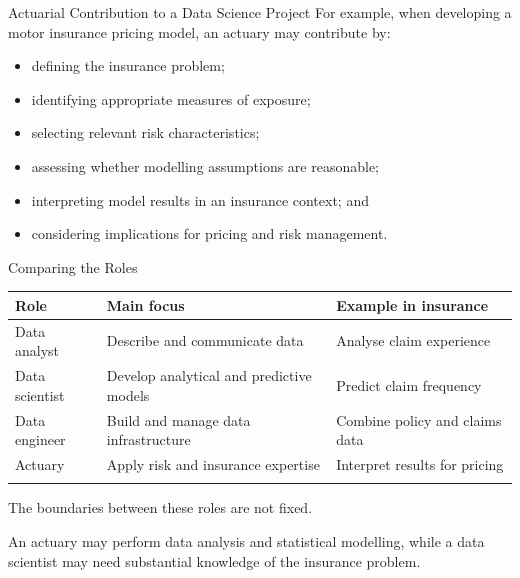 \documentclass[
  ignorenonframetext,
  aspectratio=169,
]{beamer}
\newcounter{none} %
\providecommand{\tightlist}{%
  \setlength{\itemsep}{0pt}\setlength{\parskip}{0pt}}
\begin{document}
\begin{frame}{Actuarial Contribution to a Data Science Project}
\protect{}\label{actuarial-contribution-to-a-data-science-project}
For example, when developing a motor insurance pricing model, an actuary
may contribute by:

\begin{itemize}
\tightlist
\item
  defining the insurance problem;
\item
  identifying appropriate measures of exposure;
\item
  selecting relevant risk characteristics;
\item
  assessing whether modelling assumptions are reasonable;
\item
  interpreting model results in an insurance context; and
\item
  considering implications for pricing and risk management.
\end{itemize}
\end{frame}

\begin{frame}{Comparing the Roles}
\protect{}\label{comparing-the-roles}
{\def\LTcaptype{none} %
\begin{longtable}[]{@{}
  >{\raggedright\arraybackslash}p{}
  >{\raggedright\arraybackslash}p{}
  >{\raggedright\arraybackslash}p{}@{}}
\toprule\noalign{}
\begin{minipage}[b]{\linewidth}\raggedright
Role
\end{minipage} & \begin{minipage}[b]{\linewidth}\raggedright
Main focus
\end{minipage} & \begin{minipage}[b]{\linewidth}\raggedright
Example in insurance
\end{minipage} \\
\midrule\noalign{}
\endhead
Data analyst & Describe and communicate data & Analyse claim
experience \\
Data scientist & Develop analytical and predictive models & Predict
claim frequency \\
Data engineer & Build and manage data infrastructure & Combine policy
and claims data \\
Actuary & Apply risk and insurance expertise & Interpret results for
pricing \\
\bottomrule\noalign{}
\end{longtable}
}

The boundaries between these roles are not fixed.

An actuary may perform data analysis and statistical modelling, while a
data scientist may need substantial knowledge of the insurance problem.
\end{frame}
\end{document}
